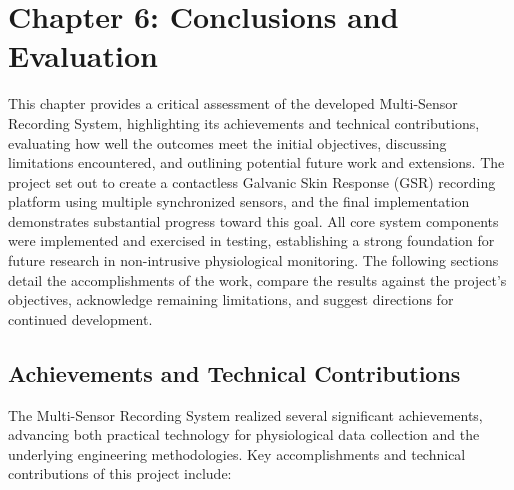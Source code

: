\label{chap:6} \chapter{Chapter 6: Conclusions and Evaluation}

This chapter provides a critical assessment of the developed Multi-Sensor Recording System, highlighting its achievements and technical contributions, evaluating how well the outcomes meet the initial objectives, discussing limitations encountered, and outlining potential future work and extensions. The project set out to create a contactless Galvanic Skin Response (GSR) recording platform using multiple synchronized sensors, and the final implementation demonstrates substantial progress toward this goal. All core system components were implemented and exercised in testing, establishing a strong foundation for future research in non-intrusive physiological monitoring. The following sections detail the accomplishments of the work, compare the results against the project's objectives, acknowledge remaining limitations, and suggest directions for continued development.

\section{Achievements and Technical Contributions}

The Multi-Sensor Recording System realized several significant achievements, advancing both practical technology for physiological data collection and the underlying engineering methodologies. Key accomplishments and technical contributions of this project include:

